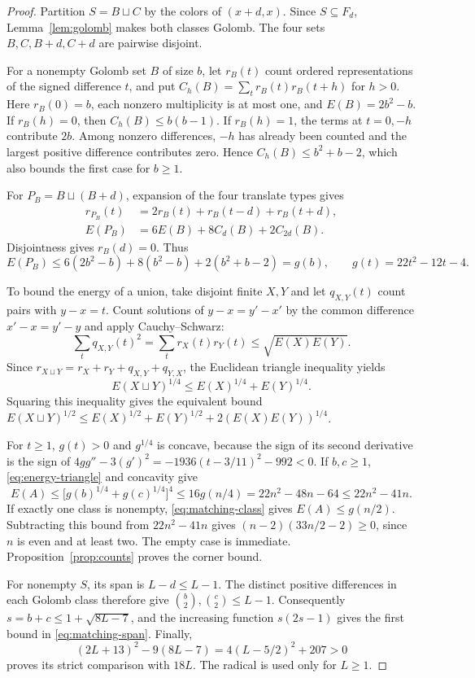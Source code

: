\documentclass[11pt,a4paper]{article}
\theoremstyle{definition}
\numberwithin{equation}{section}
\begin{document}
\begin{proof}
Partition $S=B\sqcup C$ by the colors of $(x+d,x)$. Since $S\subseteq F_d$, Lemma~\ref{lem:golomb} makes both classes Golomb. The four sets $B,C,B+d,C+d$ are pairwise disjoint.

For a nonempty Golomb set $B$ of size $b$, let $r_B(t)$ count ordered representations of the signed difference $t$, and put $C_h(B)=\sum_t r_B(t)r_B(t+h)$ for $h>0$. Here $r_B(0)=b$, each nonzero multiplicity is at most one, and $E(B)=2b^2-b$. If $r_B(h)=0$, then $C_h(B)\le b(b-1)$. If $r_B(h)=1$, the terms at $t=0,-h$ contribute $2b$. Among nonzero differences, $-h$ has already been counted and the largest positive difference contributes zero. Hence $C_h(B)\le b^2+b-2$, which also bounds the first case for $b\ge1$.

For $P_B=B\sqcup(B+d)$, expansion of the four translate types gives
\begin{equation}\label{eq:matching-correlation}
\begin{aligned}
r_{P_B}(t)&=2r_B(t)+r_B(t-d)+r_B(t+d),\\
E(P_B)&=6E(B)+8C_d(B)+2C_{2d}(B).
\end{aligned}
\end{equation}
Disjointness gives $r_B(d)=0$. Thus
\begin{equation}\label{eq:matching-class}
E(P_B)\le6(2b^2-b)+8(b^2-b)+2(b^2+b-2)
=g(b),\qquad g(t)=22t^2-12t-4.
\end{equation}

To bound the energy of a union, take disjoint finite $X,Y$ and let $q_{X,Y}(t)$ count pairs with $y-x=t$. Count solutions of $y-x=y'-x'$ by the common difference $x'-x=y'-y$ and apply Cauchy--Schwarz:
\[
\sum_t q_{X,Y}(t)^2=\sum_t r_X(t)r_Y(t)\le\sqrt{E(X)E(Y)}.
\]
Since $r_{X\sqcup Y}=r_X+r_Y+q_{X,Y}+q_{Y,X}$, the Euclidean triangle inequality yields
\begin{equation}\label{eq:energy-triangle}
E(X\sqcup Y)^{1/4}\le E(X)^{1/4}+E(Y)^{1/4}.
\end{equation}
Squaring this inequality gives the equivalent bound
$E(X\sqcup Y)^{1/2}\le E(X)^{1/2}+E(Y)^{1/2}+2(E(X)E(Y))^{1/4}$.

For $t\ge1$, $g(t)>0$ and $g^{1/4}$ is concave, because the sign of its second derivative is the sign of
$4gg''-3(g')^2=-1936(t-3/11)^2-992<0$.
If $b,c\ge1$, \eqref{eq:energy-triangle} and concavity give
\[
E(A)\le\bigl[g(b)^{1/4}+g(c)^{1/4}\bigr]^4
\le16g(n/4)=22n^2-48n-64\le22n^2-41n.
\]
If exactly one class is nonempty, \eqref{eq:matching-class} gives $E(A)\le g(n/2)$. Subtracting this bound from $22n^2-41n$ gives $(n-2)(33n/2-2)\ge0$, since $n$ is even and at least two. The empty case is immediate. Proposition~\ref{prop:counts} proves the corner bound.

For nonempty $S$, its span is $L-d\le L-1$. The distinct positive differences in each Golomb class therefore give $\binom b2,\binom c2\le L-1$. Consequently $s=b+c\le1+\sqrt{8L-7}$, and the increasing function $s(2s-1)$ gives the first bound in \eqref{eq:matching-span}. Finally,
\[
(2L+13)^2-9(8L-7)=4(L-5/2)^2+207>0
\]
proves its strict comparison with $18L$. The radical is used only for $L\ge1$.
\end{proof}
\end{document}
